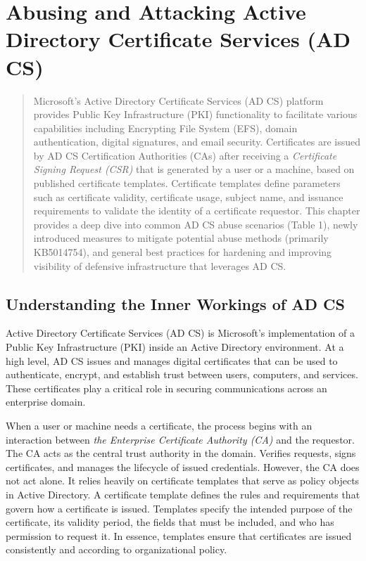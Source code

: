 \chapter{Abusing and Attacking Active Directory Certificate Services (AD CS)}

\begin{abstract} Microsoft's Active Directory Certificate Services (AD CS) platform provides Public Key Infrastructure (PKI) functionality to facilitate various capabilities including Encrypting File System (EFS), domain authentication, digital signatures, and email security. Certificates are issued by AD CS Certification Authorities (CAs) after receiving a \textit{Certificate Signing Request (CSR)} that is generated by a user or a machine, based on published certificate templates. Certificate templates define parameters such as certificate validity, certificate usage, subject name, and issuance requirements to validate the identity of a certificate requestor.
    This chapter provides a deep dive into common AD CS abuse scenarios (Table 1), newly introduced measures to mitigate potential abuse methods (primarily KB5014754), and general best practices for hardening and improving visibility of defensive infrastructure that leverages AD CS.
\end{abstract}

\section{Understanding the Inner Workings of AD CS}
Active Directory Certificate Services (AD CS) is Microsoft's implementation of a Public Key Infrastructure (PKI) inside an Active Directory environment. At a high level, AD CS issues and manages digital certificates that can be used to authenticate, encrypt, and establish trust between users, computers, and services. These certificates play a critical role in securing communications across an enterprise domain.

When a user or machine needs a certificate, the process begins with an interaction between \textit{ the Enterprise Certificate Authority (CA)} and the requestor. The CA acts as the central trust authority in the domain. Verifies requests, signs certificates, and manages the lifecycle of issued credentials. However, the CA does not act alone. It relies heavily on certificate templates that serve as policy objects in Active Directory. A certificate template defines the rules and requirements that govern how a certificate is issued. Templates specify the intended purpose of the certificate, its validity period, the fields that must be included, and who has permission to request it. In essence, templates ensure that certificates are issued consistently and according to organizational policy.

